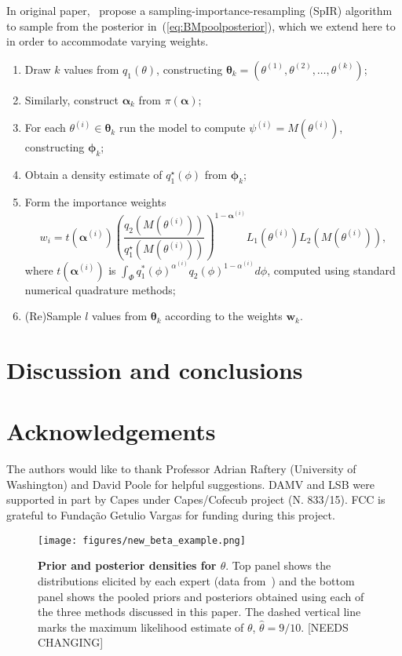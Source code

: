 \documentclass[a4paper, notitlepage, 10pt]{article}
\begin{document}
In original paper,~\cite[sec. 3.4]{poole2000} propose a sampling-importance-resampling (SpIR) algorithm to sample from the posterior in~(\ref{eq:BMpoolposterior}), which we extend here to in order to accommodate varying weights.
\begin{enumerate}
 \item Draw $k$ values from  $q_1(\theta)$, constructing $\boldsymbol \theta_k = (\theta^{(1)}, \theta^{(2)}, \ldots, \theta^{(k)} )$;
 \item Similarly, construct $\boldsymbol \alpha_k$ from $\pi(\boldsymbol \alpha)$;
 \item For each $\theta^{(i)} \in \boldsymbol\theta_k$ run the model to compute $\psi^{(i)} = M(\theta^{(i)})$, constructing $\boldsymbol \phi_k$;
 \item Obtain a density estimate of $q_1^\star(\phi)$ from  $\boldsymbol \phi_k$;
 \item Form the importance weights 
 \begin{equation}
 \label{eq:SpIRweights}
  w_i = t(\boldsymbol \alpha^{(i)}) \left(\frac{q_2(M(\theta^{(i)}))}{q_1^\star(M(\theta^{(i)}))}\right)^{1 - \boldsymbol \alpha^{(i)}} L_1(\theta^{(i)}) L_2(M(\theta^{(i)})),
 \end{equation}
where $t(\boldsymbol \alpha^{(i)})$ is $\int_{\Phi} q_1^\ast(\phi)^{\alpha^{(i)}} q_2(\phi)^{1-\alpha^{(i)}} d\phi$, computed using standard numerical quadrature methods;
 \item (Re)Sample $l$ values from $\boldsymbol \theta_k$ according to the weights $\boldsymbol w_k$.
\end{enumerate}

\section{Discussion and conclusions}
\label{sec:discussion}


\section{Acknowledgements}
The authors would like to thank Professor Adrian Raftery (University of Washington) and David Poole for helpful suggestions.
DAMV and LSB were supported in part by Capes under Capes/Cofecub project (N. 833/15).
FCC is grateful to Funda\c{c}\~ao Getulio Vargas for funding during this 
project.


\begin{figure}[!ht]
\centering
\texttt{[image: figures/new\_beta\_example.png]}
\caption{\textbf{Prior and posterior densities for $\theta$}.
Top panel shows the distributions elicited by each expert (data from~\cite{savchuk1994}) and the bottom panel shows the pooled priors and posteriors obtained using each of the three methods discussed in this paper.
The dashed vertical line marks the maximum likelihood estimate of $\theta$, $\hat{\theta}= 9/10$.
[NEEDS CHANGING]}
\label{fig:priors_posteriors_beta}
\end{figure}
\end{document}
